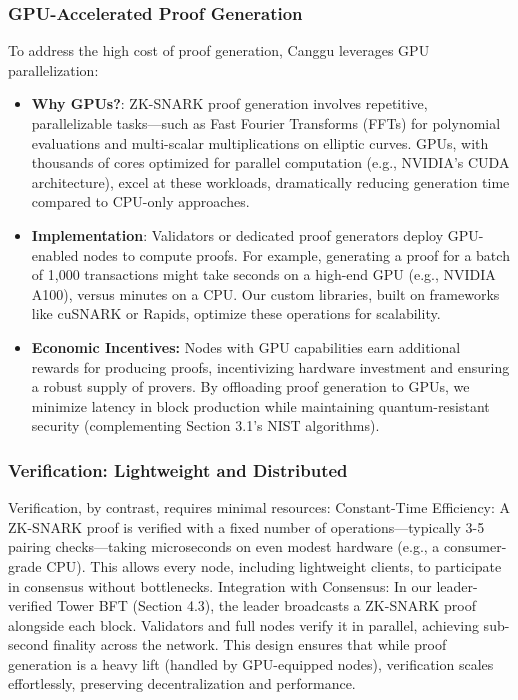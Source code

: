 \documentclass[12pt]{article}
\begin{document}
\subsubsection{GPU-Accelerated Proof Generation}
\begin{justify}
To address the high cost of proof generation, Canggu leverages GPU parallelization:
\begin{itemize}
    \item \textbf{Why GPUs?}: ZK-SNARK proof generation involves repetitive, parallelizable tasks—such as Fast Fourier Transforms (FFTs) for polynomial evaluations and multi-scalar multiplications on elliptic curves. GPUs, with thousands of cores optimized for parallel computation (e.g., NVIDIA’s CUDA architecture), excel at these workloads, dramatically reducing generation time compared to CPU-only approaches.

    \item \textbf{Implementation}: Validators or dedicated proof generators deploy GPU-enabled nodes to compute proofs. For example, generating a proof for a batch of 1,000 transactions might take seconds on a high-end GPU (e.g., NVIDIA A100), versus minutes on a CPU. Our custom libraries, built on frameworks like cuSNARK or Rapids, optimize these operations for scalability.

    \item \textbf{Economic Incentives:} Nodes with GPU capabilities earn additional rewards for producing proofs, incentivizing hardware investment and ensuring a robust supply of provers.
By offloading proof generation to GPUs, we minimize latency in block production while maintaining quantum-resistant security (complementing Section 3.1’s NIST algorithms).
    
\end{itemize}

\end{justify}

\subsubsection{Verification: Lightweight and Distributed}

\begin{justify}
Verification, by contrast, requires minimal resources:
Constant-Time Efficiency: A ZK-SNARK proof is verified with a fixed number of operations—typically 3-5 pairing checks—taking microseconds on even modest hardware (e.g., a consumer-grade CPU). This allows every node, including lightweight clients, to participate in consensus without bottlenecks.
Integration with Consensus: In our leader-verified Tower BFT (Section 4.3), the leader broadcasts a ZK-SNARK proof alongside each block. Validators and full nodes verify it in parallel, achieving sub-second finality across the network.
This design ensures that while proof generation is a heavy lift (handled by GPU-equipped nodes), verification scales effortlessly, preserving decentralization and performance.

\end{justify}
\end{document}
